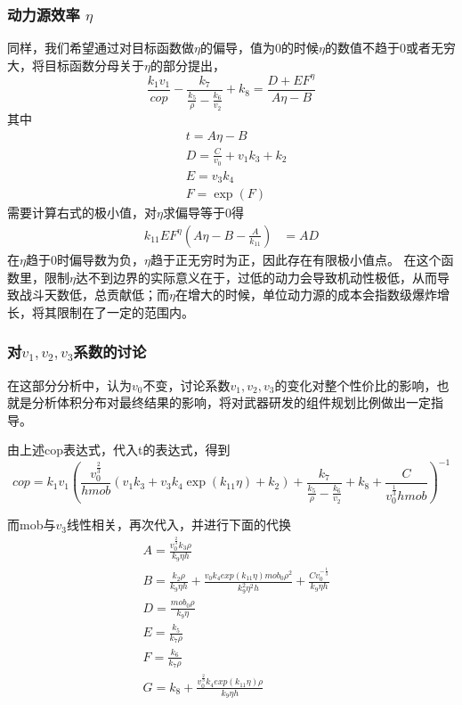 \documentclass[UTF8]{mcmthesis}
\begin{document}
\subsubsection{动力源效率 $\eta$}
同样，我们希望通过对目标函数做$\eta$的偏导，值为0的时候$\eta$的数值不趋于0或者无穷大，将目标函数分母关于$\eta$的部分提出，
\begin{equation}
\frac{k_1v_1}{cop}-\frac{k_7}{\frac{k_5}{\rho}-\frac{k_6}{v_2}}+k_8=\frac{D+EF^{\eta}}{A\eta-B}
\end{equation}
其中
\begin{align*}
&t=A\eta-B\\
&D=\frac{C}{v_0}+v_1k_3+k_2\\
&E=v_3k_4\\
&F=\exp(F)
\end{align*}
需要计算右式的极小值，对$\eta$求偏导等于0得
\begin{align*}
k_{11}EF^{\eta}(A\eta-B-\frac{A}{k_{11}})&=AD
\end{align*}
在$\eta$趋于0时偏导数为负，$\eta$趋于正无穷时为正，因此存在有限极小值点。
在这个函数里，限制$\eta$达不到边界的实际意义在于，过低的动力会导致机动性极低，从而导致战斗天数低，总贡献低；而$\eta$在增大的时候，单位动力源的成本会指数级爆炸增长，将其限制在了一定的范围内。
\subsubsection{对$v_1,v_2,v_3$系数的讨论}
在这部分分析中，认为$v_0$不变，讨论系数$v_1,v_2,v_3$的变化对整个性价比的影响，也就是分析体积分布对最终结果的影响，将对武器研发的组件规划比例做出一定指导。

由上述cop表达式，代入t的表达式，得到
\begin{equation}
cop=k_1v_1\left(\frac{v_0^{\frac{2}{3}}}{h mob}(v_1k_3+v_3k_4\exp(k_{11}\eta)+k_2)+\frac{k_7}{\frac{k_5}{\rho}-\frac{k_6}{v_2}}+k_8+\frac{C}{v_0^{\frac{1}{3}}h mob}\right)^{-1}
\end{equation}

而mob与$v_3$线性相关，再次代入，并进行下面的代换
\begin{align*}
&A=\frac{v_0^{\frac{2}{3}}k_3\rho}{k_9\eta h}\\
&B=\frac{k_2\rho}{k_9\eta h}+\frac{v_0k_4exp(k_{11}\eta)mob_0\rho^2}{k_9^2\eta^2h}+\frac{Cv_0^{-\frac{1}{3}}}{k_9\eta h}\\
&D=\frac{mob_0\rho}{k_9\eta}\\
&E=\frac{k_5}{k_7\rho}\\
&F=\frac{k_6}{k_7\rho}\\
&G=k_8+\frac{v_0^{\frac{2}{3}}k_4exp(k_{11}\eta)\rho}{k_9\eta h}
\end{align*}
\end{document}
